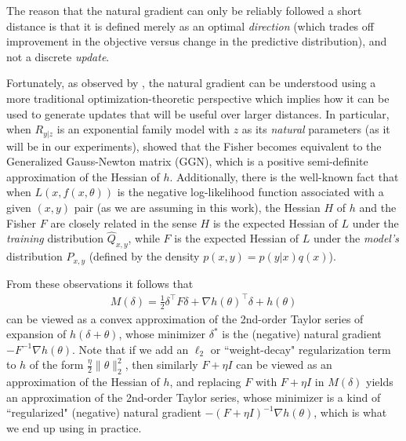 \documentclass[12pt]{article}
\begin{document}
The reason that the natural gradient can only be reliably followed a short distance is that it is defined merely as an optimal \emph{direction} (which trades off improvement in the objective versus change in the predictive distribution), and not a discrete \emph{update}.  

Fortunately, as observed by \citet{ng_martens}, the natural gradient can be understood using a more traditional optimization-theoretic perspective which implies how it can be used to generate updates that will be useful over larger distances.  In particular, when $R_{y|z}$ is an exponential family model with $z$ as its \emph{natural} parameters (as it will be in our experiments), \citet{ng_martens} showed that the Fisher becomes equivalent to the Generalized Gauss-Newton matrix (GGN), which is a positive semi-definite approximation of the Hessian of $h$.  Additionally, there is the well-known fact that when $L(x,f(x,\theta))$ is the negative log-likelihood function associated with a given $(x,y)$ pair (as we are assuming in this work), the Hessian $H$ of $h$ and the Fisher $F$ are closely related in the sense $H$ is the expected Hessian of $L$ under the \emph{training} distribution $\hat{Q}_{x,y}$, while $F$ is the expected Hessian of $L$ under the \emph{model's} distribution $P_{x,y}$ (defined by the density $p(x,y) = p(y|x)q(x)$).

From these observations it follows that 
\begin{align}
\label{eqn:quad_model}
M(\delta) = \frac{1}{2} \delta^\top F \delta + \nabla h(\theta)^\top \delta + h(\theta)
\end{align}
can be viewed as a convex approximation of the 2nd-order Taylor series of expansion of $h(\delta + \theta)$, whose minimizer $\delta^*$ is the (negative) natural gradient $-F^{-1} \nabla h(\theta)$.  Note that if we add an $\ell_2$ or ``weight-decay" regularization term to $h$ of the form $\displaystyle \frac{\eta}{2} \| \theta \|_2^2$, then similarly $F + \eta I$ can be viewed as an approximation of the Hessian of $h$, and replacing $F$ with $F + \eta I$ in $M(\delta)$ yields an approximation of the 2nd-order Taylor series, whose minimizer is a kind of ``regularized" (negative) natural gradient $-(F + \eta I)^{-1} \nabla h(\theta)$, which is what we end up using in practice.
\end{document}
